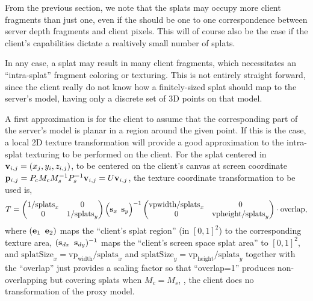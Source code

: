From the previous section, we note that the splats may occupy more client
fragments than just one, even if the should be one to one correspondence between
server depth fragments and client pixels. This will of course also be the case
if the client's capabilities dictate a realtively small number of splats.

In any case, a splat may result in many client fragments, which necessitates an
``intra-splat'' fragment coloring or texturing. This is not entirely straight
forward, since the client really do not know how a finitely-sized splat should
map to the server's model, having only a discrete set of 3D points on that
model.

\vspace{10cm}

A first approximation is for the client to assume that the corresponding part of
the server's model is planar in a region around the given point. If this is the
case, a local 2D texture transformation will provide a good approximation to the
intra-splat texturing to be performed on the client. For the splat centered in
$\mathbf{v}_{i, j} = (x_j, y_i, z_{i, j})$, to be centered on the client's canvas at
screen coordinate $\mathbf{p}_{i, j} = P_c M_c M_s^{-1} P_s^{-1}\mathbf{v}_{i, j} = U\mathbf{v}_{i,
j}$, the texture coordinate transformation to be used is,
\[
  T =
  \begin{pmatrix} 1/\text{splats}_x & 0 \\ 0 & 1/\text{splats}_y \end{pmatrix}
  \Big( \mathbf{s}_x \, \, \, \mathbf{s}_y \Big)^{-1}
  \begin{pmatrix} \text{vpwidth}/\text{splats}_x & 0 \\ 0 & \text{vpheight}/\text{splats}_y \end{pmatrix}
  \cdot \text{overlap},
\]
where $(\mathbf{e}_1 \, \, \, \mathbf{e}_2)$ maps the ``client's splat region'' (in $[0,
1]^2$) to the corresponding texture area, $(\mathbf{s}_{dx} \, \, \, \mathbf{s}_{dy})^{-1}$
maps the ``client's screen space splat area'' to $[0, 1]^2$, and $\text{splatSize}_x
= \text{vp}_\text{width}/\text{splats}_x$ and $\text{splatSize}_y
= \text{vp}_\text{height}/\text{splats}_y$ together with the ``overlap'' just
provides a scaling factor so that ``overlap=1'' produces non-overlapping but
covering splats when $M_c=M_s$, \ie, the client does no transformation of the
proxy model.


